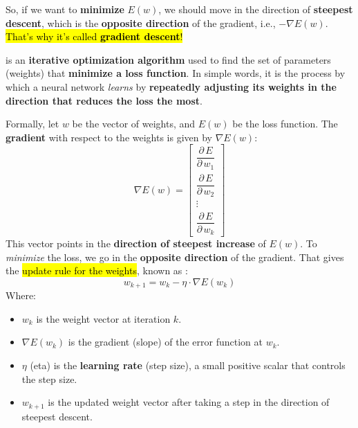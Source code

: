 \highspace
\textcolor{Green3}{} So, if we want to \textbf{minimize} $E(w)$, we should move in the direction of \textbf{steepest descent}, which is the \textbf{opposite direction} of the gradient, i.e., $-\nabla E(w)$. \hl{That's why it's called \textbf{gradient descent}!}

\highspace
\begin{definitionbox}\label{def:gradient-descent}
     is an \textbf{iterative optimization algorithm} used to find the set of parameters (weights) that \textbf{minimize a loss function}. In simple words, it is the process by which a neural network \emph{learns} by \textbf{repeatedly adjusting its weights in the direction that reduces the loss the most}.

    \highspace
    Formally, let $w$ be the vector of weights, and $E(w)$ be the loss function. The \textbf{gradient} with respect to the weights is given by $\nabla E(w)$:
    \begin{equation}
        \nabla E(w) = \begin{bmatrix}
            \dfrac{\partial \, E}{\partial \, w_{1}} \\[1.2em]
            \dfrac{\partial \, E}{\partial \, w_{2}} \\[1.2em]
            \vdots \\[1em]
            \dfrac{\partial \, E}{\partial \, w_{k}}
        \end{bmatrix}
    \end{equation}
    This vector points in the \textbf{direction of steepest increase} of $E(w)$. To \emph{minimize} the loss, we go in the \textbf{opposite direction} of the gradient. That gives the \hl{update rule for the weights}, known as :
    \begin{equation}
        w_{k+1} = w_{k} - \eta \cdot \nabla E(w_{k})
    \end{equation}
    Where:
    \begin{itemize}
        \item $w_{k}$ is the weight vector at iteration $k$.
        \item $\nabla E(w_{k})$ is the gradient (slope) of the error function at $w_{k}$.
        \item $\eta$ (eta) is the \textbf{learning rate} (step size), a small positive scalar that controls the step size.
        \item $w_{k+1}$ is the updated weight vector after taking a step in the direction of steepest descent.

\end{itemize}
\end{definitionbox}
